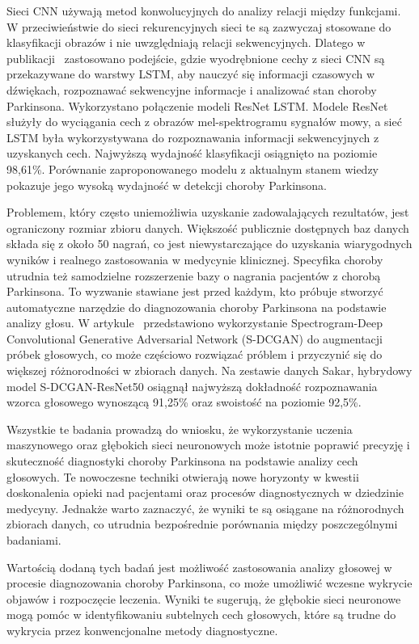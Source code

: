 Sieci CNN używają metod konwolucyjnych do analizy relacji między funkcjami.
W przeciwieństwie do sieci rekurencyjnych sieci te są zazwyczaj stosowane do klasyfikacji obrazów i nie uwzględniają relacji sekwencyjnych.
Dlatego w publikacji~\cite{ER2021103006} zastosowano podejście, gdzie wyodrębnione cechy z sieci CNN są przekazywane do warstwy LSTM, aby nauczyć się
informacji czasowych w dźwiękach, rozpoznawać sekwencyjne informacje i analizować stan choroby Parkinsona.
Wykorzystano połączenie modeli ResNet LSTM\@.
Modele ResNet służyły do wyciągania cech z obrazów mel-spektrogramu sygnałów mowy, a
sieć LSTM była wykorzystywana do rozpoznawania informacji sekwencyjnych z uzyskanych cech.
Najwyższą wydajność klasyfikacji osiągnięto na poziomie 98,61\%.
Porównanie zaproponowanego modelu z aktualnym stanem wiedzy pokazuje jego wysoką wydajność w detekcji choroby Parkinsona.

Problemem, który często uniemożliwia uzyskanie zadowalających rezultatów, jest ograniczony rozmiar zbioru danych.
Większość publicznie dostępnych baz danych składa się z około 50 nagrań, co jest niewystarczające do uzyskania wiarygodnych wyników i
realnego zastosowania w medycynie klinicznej.
Specyfika choroby utrudnia też samodzielne rozszerzenie bazy o nagrania pacjentów z chorobą Parkinsona.
To wyzwanie stawiane jest przed każdym, kto próbuje stworzyć automatyczne narzędzie do diagnozowania choroby Parkinsona na podstawie analizy głosu.
W artykule~\cite{9257451} przedstawiono wykorzystanie Spectrogram-Deep Convolutional Generative Adversarial Network (S-DCGAN) do
augmentacji próbek głosowych, co może częściowo rozwiązać próblem i przyczynić się do większej różnorodności w zbiorach danych.
Na zestawie danych Sakar, hybrydowy model S-DCGAN-ResNet50 osiągnął najwyższą dokładność rozpoznawania wzorca głosowego wynoszącą 91,25\%
oraz swoistość na poziomie 92,5\%.

Wszystkie te badania prowadzą do wniosku, że wykorzystanie uczenia maszynowego oraz głębokich sieci neuronowych może istotnie poprawić precyzję
i skuteczność diagnostyki choroby Parkinsona na podstawie analizy cech głosowych.
Te nowoczesne techniki otwierają nowe horyzonty w kwestii doskonalenia opieki nad pacjentami oraz procesów diagnostycznych w dziedzinie medycyny.
Jednakże warto zaznaczyć, że wyniki te są osiągane na różnorodnych zbiorach danych, co utrudnia bezpośrednie porównania między poszczególnymi badaniami.

Wartością dodaną tych badań jest możliwość zastosowania analizy głosowej w procesie diagnozowania choroby Parkinsona, co może umożliwić
wczesne wykrycie objawów i rozpoczęcie leczenia.
Wyniki te sugerują, że głębokie sieci neuronowe mogą pomóc w identyfikowaniu subtelnych cech
głosowych, które są trudne do wykrycia przez konwencjonalne metody diagnostyczne.

